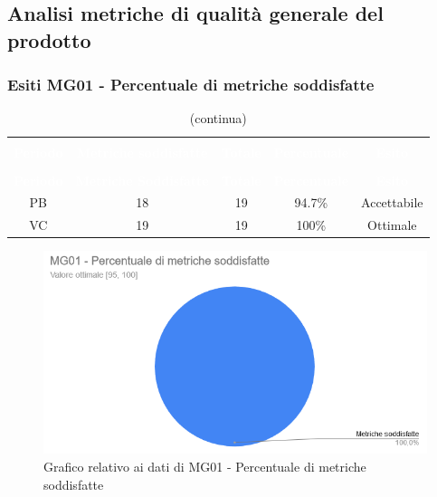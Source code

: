 \subsection{Analisi metriche di qualità generale del prodotto}
\subsubsection{Esiti MG01 - Percentuale di metriche soddisfatte}
\begin{longtable}{c c c c c}
\rowcolor{white}\caption{Esiti MG01 - PMS}\\
		\rowcolor{redafk}
		\textcolor{white}{\textbf{Periodo}} &
\textcolor{white}{\textbf{Metriche soddisfatte}} & \textcolor{white}{\textbf{Totale}} & 
\textcolor{white}{\textbf{Percentuale}} & \textcolor{white}{\textbf{Esito}}\\
		\endfirsthead
		\rowcolor{white}\caption[]{(continua)} \\
		\rowcolor{redafk}
		\textcolor{white}{\textbf{Periodo}} &
\textcolor{white}{\textbf{Metriche Soddisfatte}} & \textcolor{white}{\textbf{Totale}} & 
\textcolor{white}{\textbf{Percentuale}} & \textcolor{white}{\textbf{Esito}}\\
		\endhead
		PB & 18 & 19 & 94.7\% & Accettabile\\
		VC & 19 & 19 & 100\% & Ottimale\\
\end{longtable}

\begin{figure}[H]
\centering
\includegraphics[scale=0.7]{./img/MG01.png}
\caption{Grafico relativo ai dati di MG01 - Percentuale di metriche soddisfatte}
\end{figure}


